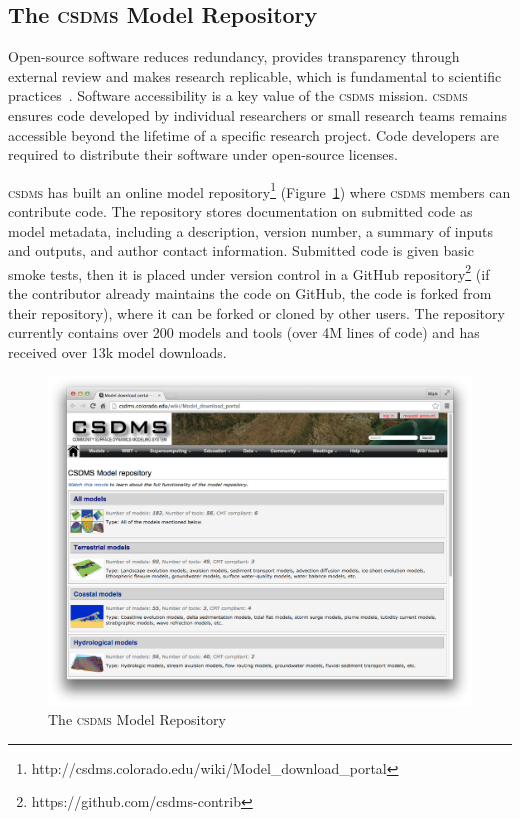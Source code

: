 \documentclass[11pt, oneside]{amsart}
\DeclareRobustCommand{\csdms}{\textsc{csdms}}
\begin{document}
\subsection{The \csdms{} Model Repository}
\label{sec:repository}

Open-source software reduces redundancy, provides transparency through
external review and makes research replicable, which is fundamental to
scientific practices~\cite{ince2012case}.
Software accessibility is a key value of the \csdms{} mission. \csdms{}
ensures code developed by individual researchers or small research teams
remains accessible beyond the lifetime of a specific research project. Code
developers are required to distribute their software under open-source licenses. 

\csdms{} has built an online model 
repository\footnote{http://csdms.colorado.edu/wiki/Model\_download\_portal}
(Figure~\ref{fig:model_repository_screenshot})
where \csdms{} members can contribute code.
The repository stores documentation on submitted code as model metadata,
including a description, version number,
a summary of inputs and outputs,
and author contact information.
Submitted code is given basic smoke tests,
then it is placed under version control in a 
GitHub repository\footnote{https://github.com/csdms-contrib}
(if the contributor already maintains the code on GitHub, 
the code is forked from their repository), 
where it can be forked or cloned by other users.
The repository currently contains over 200 models and tools (over
4M lines of code) and has received over 13k model downloads.

\begin{figure}
  \caption{The \csdms{} Model Repository}
  \begin{center}
    \includegraphics[scale=.25]{csdms_model_repository.eps}
  \end{center}
  \label{fig:model_repository_screenshot}
\end{figure}
\end{document}
